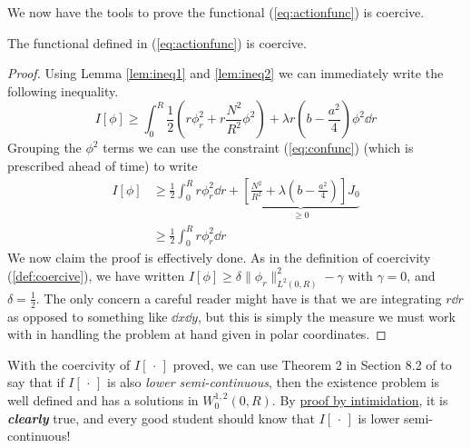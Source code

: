 We now have the tools to prove the functional (\ref{eq:actionfunc}) is coercive.
\begin{theorem}
The functional defined in (\ref{eq:actionfunc}) is coercive.
\end{theorem}
\begin{proof}
Using Lemma \ref{lem:ineq1} and \ref{lem:ineq2} we can immediately write the following inequality.
\begin{equation}
I[\phi] \geq \int_0^R\frac{1}{2}\left(r\phi_r^2 + r\frac{N^2}{R^2}\phi^2\right) + \lambda r\left(b - \frac{a^2}{4}\right)\phi^2\dd{r}
\end{equation}
Grouping the $\phi^2$ terms we can use the constraint (\ref{eq:confunc}) (which is prescribed ahead of time) to write
\begin{align}
I[\phi] & \geq \frac{1}{2}\int_0^R r\phi_r^2\dd{r} + \underbrace{\left[\frac{N^2}{R^2} + \lambda \left(b - \frac{a^2}{4}\right)\right]J_0}_{\geq 0} \\
 & \geq \frac{1}{2}\int_0^R r\phi_r^2\dd{r}
\end{align}
We now claim the proof is effectively done. As in the definition of coercivity (\ref{def:coercive}), we have written $I[\phi]\geq \delta\|\phi_r\|^2_{L^2(0,R)} - \gamma$ with $\gamma = 0 $, and $\delta = \frac{1}{2}$. The only concern a careful reader might have is that we are integrating $r\dd{r}$ as opposed to something like $\dd{x}\dd{y}$, but this is simply the measure we must work with in handling the problem at hand given in polar coordinates.
\end{proof}

With the coercivity of $I[\,\cdot\,]$ proved, we can use Theorem 2 in Section 8.2 of \cite{PDE} to say that if $I[\,\cdot\,]$ is also \textit{lower semi-continuous}, then the existence problem is well defined and has a solutions in $W^{1,2}_0(0,R)$. By \href{https://en.wikipedia.org/wiki/Proof_by_intimidation}{proof by intimidation}, it is \textit{\textbf{clearly}} true, and every good student should know that $I[\,\cdot\,]$ is lower semi-continuous!


